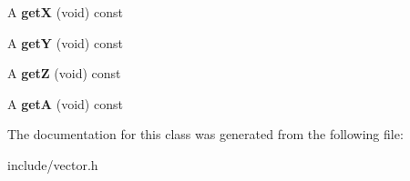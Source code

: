 \begin{DoxyCompactItemize}
\item 
\hypertarget{classVector4_a6613cf17df2c78e2b2db99b2cb9a3bb8}{}A {\bfseries get\+X} (void) const \label{classVector4_a6613cf17df2c78e2b2db99b2cb9a3bb8}

\item 
\hypertarget{classVector4_aa7e9869f9331a6ec92b19edfd7f8cb46}{}A {\bfseries get\+Y} (void) const \label{classVector4_aa7e9869f9331a6ec92b19edfd7f8cb46}

\item 
\hypertarget{classVector4_a2fd4f93493a151d86e7f1aeb25847911}{}A {\bfseries get\+Z} (void) const \label{classVector4_a2fd4f93493a151d86e7f1aeb25847911}

\item 
\hypertarget{classVector4_a5ec2f085ec5fed5af06cc44c8be4815a}{}A {\bfseries get\+A} (void) const \label{classVector4_a5ec2f085ec5fed5af06cc44c8be4815a}

\end{DoxyCompactItemize}


The documentation for this class was generated from the following file\+:\begin{DoxyCompactItemize}
\item 
include/vector.\+h\end{DoxyCompactItemize}
